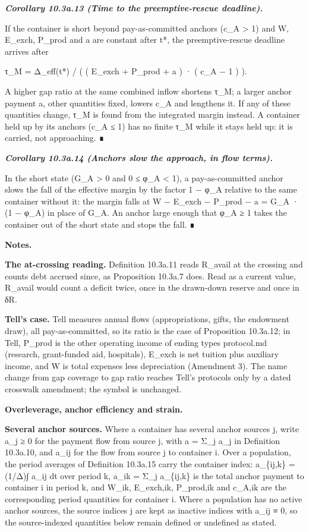 \documentclass[
]{article}
\begin{document}
\emph{\textbf{Corollary 10.3a.13 (Time to the preemptive-rescue
deadline).}}

If the container is short beyond pay-as-committed anchors (c\_A
\textgreater{} 1) and W, E\_exch, P\_prod and a are constant after t*,
the preemptive-rescue deadline arrives after

τ\_M = Δ\_eff(t*) / ( ( E\_exch + P\_prod + a ) · ( c\_A − 1 ) ).

A higher gap ratio at the same combined inflow shortens τ\_M; a larger
anchor payment a, other quantities fixed, lowers c\_A and lengthens it.
If any of these quantities change, τ\_M is found from the integrated
margin instead. A container held up by its anchors (c\_A ≤ 1) has no
finite τ\_M while it stays held up: it is carried, not approaching. ∎

\emph{\textbf{Corollary 10.3a.14 (Anchors slow the approach, in flow
terms).}}

In the short state (G\_A \textgreater{} 0 and 0 ≤ φ\_A \textless{} 1), a
pay-as-committed anchor slows the fall of the effective margin by the
factor 1 − φ\_A relative to the same container without it: the margin
falls at W − E\_exch − P\_prod − a = G\_A · (1 − φ\_A) in place of G\_A.
An anchor large enough that φ\_A ≥ 1 takes the container out of the
short state and stops the fall. ∎

\textbf{Notes.}

\textbf{The at-crossing reading.} Definition 10.3a.11 reads R\_avail at
the crossing and counts debt accrued since, as Proposition 10.3a.7 does.
Read as a current value, R\_avail would count a deficit twice, once in
the drawn-down reserve and once in δR.

\textbf{Tell's case.} Tell measures annual flows (appropriations, gifts,
the endowment draw), all pay-as-committed, so its ratio is the case of
Proposition 10.3a.12; in Tell, P\_prod is the other operating income of
ending types protocol.md (research, grant-funded aid, hospitals),
E\_exch is net tuition plus auxiliary income, and W is total expenses
less depreciation (Amendment 3). The name change from gap coverage to
gap ratio reaches Tell's protocols only by a dated crosswalk amendment;
the symbol is unchanged.

\textbf{Overleverage, anchor efficiency and strain.}

\textbf{Several anchor sources.} Where a container has several anchor
sources j, write a\_j ≥ 0 for the payment flow from source j, with a =
Σ\_j a\_j in Definition 10.3a.10, and a\_ij for the flow from source j
to container i. Over a population, the period averages of Definition
10.3a.15 carry the container index: a\_\{ij,k\} = (1/Δ)∫ a\_ij dt over
period k, a\_ik = Σ\_j a\_\{ij,k\} is the total anchor payment to
container i in period k, and W\_ik, E\_exch,ik, P\_prod,ik and c\_A,ik
are the corresponding period quantities for container i. Where a
population has no active anchor sources, the source indices j are kept
as inactive indices with a\_ij ≡ 0, so the source-indexed quantities
below remain defined or undefined as stated.
\end{document}
